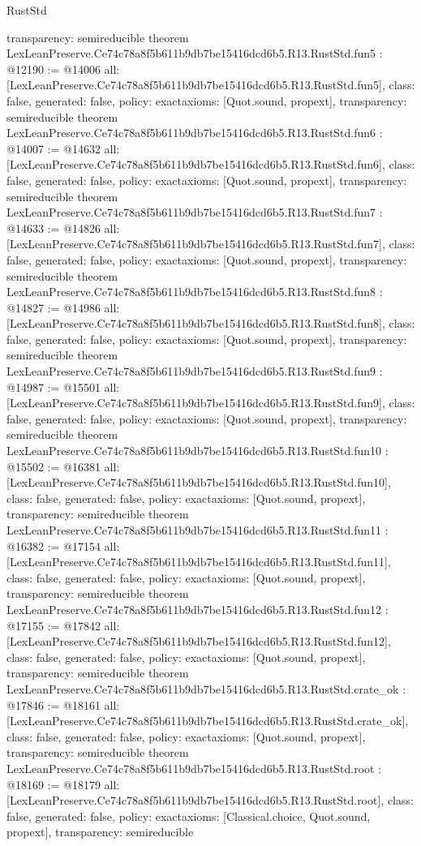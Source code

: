 \begin{lexlean}{RustStd}
\begin{coremodule}
{  transparency: semireducible
}
theorem LexLeanPreserve.Ce74c78a8f5b611b9db7be15416dcd6b5.R13.RustStd.fun5 : @12190 := @14006 {
  all: [LexLeanPreserve.Ce74c78a8f5b611b9db7be15416dcd6b5.R13.RustStd.fun5],
  class: false,
  generated: false,
  policy: exact{axioms: [Quot.sound, propext]},
  transparency: semireducible
}
theorem LexLeanPreserve.Ce74c78a8f5b611b9db7be15416dcd6b5.R13.RustStd.fun6 : @14007 := @14632 {
  all: [LexLeanPreserve.Ce74c78a8f5b611b9db7be15416dcd6b5.R13.RustStd.fun6],
  class: false,
  generated: false,
  policy: exact{axioms: [Quot.sound, propext]},
  transparency: semireducible
}
theorem LexLeanPreserve.Ce74c78a8f5b611b9db7be15416dcd6b5.R13.RustStd.fun7 : @14633 := @14826 {
  all: [LexLeanPreserve.Ce74c78a8f5b611b9db7be15416dcd6b5.R13.RustStd.fun7],
  class: false,
  generated: false,
  policy: exact{axioms: [Quot.sound, propext]},
  transparency: semireducible
}
theorem LexLeanPreserve.Ce74c78a8f5b611b9db7be15416dcd6b5.R13.RustStd.fun8 : @14827 := @14986 {
  all: [LexLeanPreserve.Ce74c78a8f5b611b9db7be15416dcd6b5.R13.RustStd.fun8],
  class: false,
  generated: false,
  policy: exact{axioms: [Quot.sound, propext]},
  transparency: semireducible
}
theorem LexLeanPreserve.Ce74c78a8f5b611b9db7be15416dcd6b5.R13.RustStd.fun9 : @14987 := @15501 {
  all: [LexLeanPreserve.Ce74c78a8f5b611b9db7be15416dcd6b5.R13.RustStd.fun9],
  class: false,
  generated: false,
  policy: exact{axioms: [Quot.sound, propext]},
  transparency: semireducible
}
theorem LexLeanPreserve.Ce74c78a8f5b611b9db7be15416dcd6b5.R13.RustStd.fun10 : @15502 := @16381 {
  all: [LexLeanPreserve.Ce74c78a8f5b611b9db7be15416dcd6b5.R13.RustStd.fun10],
  class: false,
  generated: false,
  policy: exact{axioms: [Quot.sound, propext]},
  transparency: semireducible
}
theorem LexLeanPreserve.Ce74c78a8f5b611b9db7be15416dcd6b5.R13.RustStd.fun11 : @16382 := @17154 {
  all: [LexLeanPreserve.Ce74c78a8f5b611b9db7be15416dcd6b5.R13.RustStd.fun11],
  class: false,
  generated: false,
  policy: exact{axioms: [Quot.sound, propext]},
  transparency: semireducible
}
theorem LexLeanPreserve.Ce74c78a8f5b611b9db7be15416dcd6b5.R13.RustStd.fun12 : @17155 := @17842 {
  all: [LexLeanPreserve.Ce74c78a8f5b611b9db7be15416dcd6b5.R13.RustStd.fun12],
  class: false,
  generated: false,
  policy: exact{axioms: [Quot.sound, propext]},
  transparency: semireducible
}
theorem LexLeanPreserve.Ce74c78a8f5b611b9db7be15416dcd6b5.R13.RustStd.crate_ok : @17846 := @18161 {
  all: [LexLeanPreserve.Ce74c78a8f5b611b9db7be15416dcd6b5.R13.RustStd.crate_ok],
  class: false,
  generated: false,
  policy: exact{axioms: [Quot.sound, propext]},
  transparency: semireducible
}
theorem LexLeanPreserve.Ce74c78a8f5b611b9db7be15416dcd6b5.R13.RustStd.root : @18169 := @18179 {
  all: [LexLeanPreserve.Ce74c78a8f5b611b9db7be15416dcd6b5.R13.RustStd.root],
  class: false,
  generated: false,
  policy: exact{axioms: [Classical.choice, Quot.sound, propext]},
  transparency: semireducible
}


\end{coremodule}
\end{lexlean}
